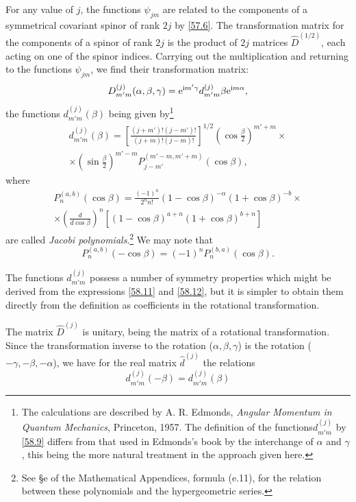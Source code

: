 For any value of $ j $, the functions $\psi_{jm}$ are related to the components of a symmetrical covariant spinor of rank $ 2j $ by \eqref{57.6}. The transformation matrix for the components of a spinor of rank $ 2j $ is the product of $ 2j $ matrices $ \hat{D}^{(1/2)} $, each acting on one of the spinor indices. Carrying out the multiplication and returning to the functions $\psi_{jm}$, we find their transformation matrix:
\begin{equation}\label{58.9}
D^{(j)}_{m'm}(\alpha,\beta,\gamma)=\mathrm{e}^{\mathrm{i} m'\gamma}d_{m'm}^{(j)}\beta\mathrm{e}^{\mathrm{i} m\alpha},
\end{equation}
the functions $ d_{m'm}^{(j)} (\beta) $ being given by\footnote{The calculations are described by A. R. Edmonds, \textit{Angular Momentum in Quantum Mechanics}, Princeton, 1957. The definition of the functions$ d_{m'm}^{(j)}$ by \eqref{58.9} differs from that used in Edmonds’s book by the interchange of $\alpha$ and $\gamma$, this being the more natural treatment in the approach given here.
}
\begin{multline}\label{58.10}
d_{m'm}^{(j)}(\beta)=\left[\frac{(j+m')!(j-m')!}{(j+m)!(j-m)!} \right]^{1/2}\left(\cos\frac{\beta}{2} \right)^{m'+m}\times\\
\times\left(\sin\frac{\beta}{2} \right)^{m'-m}P_{j-m'}^{(m'-m,m'+m)}(\cos\beta),
\end{multline}
where
\begin{multline}\label{58.11}
P_n^{(a,b)}(\cos\beta)=\frac{(-1)^n}{2^nn!}(1-\cos\beta)^{-\alpha}(1+\cos\beta)^{-b}\times\\
\times\left(\frac{d}{d\cos\beta} \right)^n\left[(1-\cos\beta)^{a+n}(1+\cos\beta)^{b+n} \right]
\end{multline}
are called \textit{Jacobi polynomials}.\footnote{See \S e of the Mathematical Appendices, formula (e.11), for the relation between these polynomials and the hypergeometric series.
} We may note that
\begin{equation}\label{58.12}
P_n^{(a,b)}(-\cos\beta)=(-1)^nP_n^{(b,a)}(\cos\beta).
\end{equation}


The functions $ d_{m'm}^{(j)} $ possess a number of symmetry properties which might be derived from the expressions \eqref{58.11} and \eqref{58.12}, but it is simpler to obtain them directly from the definition as coefficients in the rotational transformation.

The matrix $ \hat{D}^{(j)} $ is unitary, being the matrix of a rotational transformation. Since the transformation inverse to the rotation ($ \alpha,\beta,\gamma $) is the rotation ($ -\gamma,-\beta,-\alpha $), we have for the real matrix $ \hat{d}^{(j)} $ the relations
\begin{equation}\label{58.13}
d_{m'm}^{(j)}(-\beta)=d_{m'm}^{(j)}(\beta)
\end{equation}


